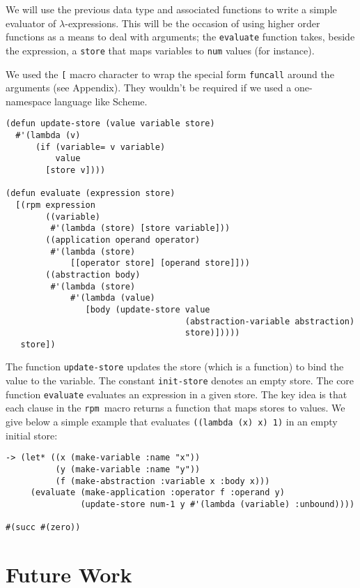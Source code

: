\documentclass[a4paper,11pt]{article}
\newcommand{\rpm}{\texttt{rpm}}
\begin{document}
We will use the previous data type and associated functions to write a
simple evaluator of $\lambda$-expressions. This will be the occasion
of using higher order functions as a means to deal with
arguments; the \texttt{evaluate} function takes, beside the expression, 
a \texttt{store} that maps variables to \texttt{num} values (for instance).

We used the \texttt{[} macro character to wrap the special form \texttt{funcall}
around the arguments (see Appendix). They wouldn't be required if we
used a one-namespace language like Scheme.

\begin{verbatim}
(defun update-store (value variable store)
  #'(lambda (v)
      (if (variable= v variable)
          value
        [store v])))

(defun evaluate (expression store)
  [(rpm expression
        ((variable)
         #'(lambda (store) [store variable]))
        ((application operand operator)
         #'(lambda (store)
             [[operator store] [operand store]]))
        ((abstraction body)
         #'(lambda (store)
             #'(lambda (value)
                [body (update-store value
                                    (abstraction-variable abstraction)
                                    store)]))))
   store])
\end{verbatim}
The function \texttt{update-store} updates the store (which is a function)
to bind the value to the variable. The constant \texttt{init-store}
denotes an empty store.  The core function \texttt{evaluate} evaluates an
expression in a given store. The key idea is that each clause in the
\rpm\  macro returns a function that maps stores to values. We
give below a simple example that evaluates \texttt{((lambda (x) x) 1)} in
an empty initial store:
\begin{verbatim}
-> (let* ((x (make-variable :name "x"))
          (y (make-variable :name "y"))
          (f (make-abstraction :variable x :body x)))
     (evaluate (make-application :operator f :operand y)
               (update-store num-1 y #'(lambda (variable) :unbound))))

#(succ #(zero))
\end{verbatim}

\section{Future Work}
\end{document}
